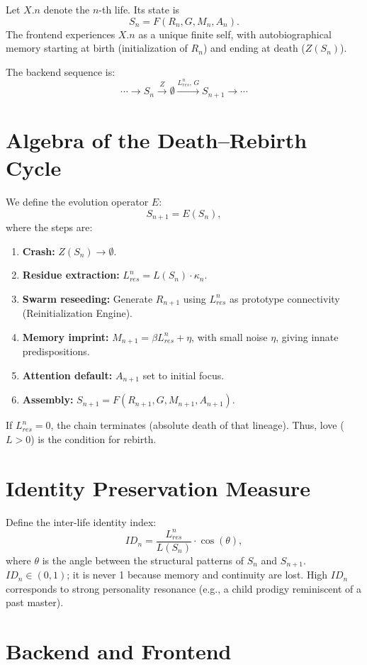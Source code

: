 \documentclass[12pt]{article}
\begin{document}
Let $X.n$ denote the $n$-th life. Its state is
\[
S_n = F(R_n, G, M_n, A_n).
\]
The frontend experiences $X.n$ as a unique finite self, with autobiographical memory starting at birth (initialization of $R_n$) and ending at death ($Z(S_n)$).

The backend sequence is:
\[
\cdots \to S_n \xrightarrow{Z} \emptyset \xrightarrow{L_{res}^n,\,G} S_{n+1} \to \cdots
\]

\section{Algebra of the Death–Rebirth Cycle}

We define the evolution operator $E$:
\[
S_{n+1} = E(S_n),
\]
where the steps are:
\begin{enumerate}
\item \textbf{Crash:} $Z(S_n) \to \emptyset$.
\item \textbf{Residue extraction:} $L_{res}^n = L(S_n)\cdot \kappa_n$.
\item \textbf{Swarm reseeding:} Generate $R_{n+1}$ using $L_{res}^n$ as prototype connectivity (Reinitialization Engine).
\item \textbf{Memory imprint:} $M_{n+1} = \beta L_{res}^n + \eta$, with small noise $\eta$, giving innate predispositions.
\item \textbf{Attention default:} $A_{n+1}$ set to initial focus.
\item \textbf{Assembly:} $S_{n+1} = F(R_{n+1}, G, M_{n+1}, A_{n+1})$.
\end{enumerate}
If $L_{res}^n = 0$, the chain terminates (absolute death of that lineage). Thus, love ($L>0$) is the condition for rebirth.

\section{Identity Preservation Measure}

Define the inter-life identity index:
\[
ID_n = \frac{L_{res}^n}{L(S_n)} \cdot \cos(\theta),
\]
where $\theta$ is the angle between the structural patterns of $S_n$ and $S_{n+1}$. $ID_n \in (0,1)$; it is never 1 because memory and continuity are lost. High $ID_n$ corresponds to strong personality resonance (e.g., a child prodigy reminiscent of a past master).

\section{Backend and Frontend}
\end{document}
